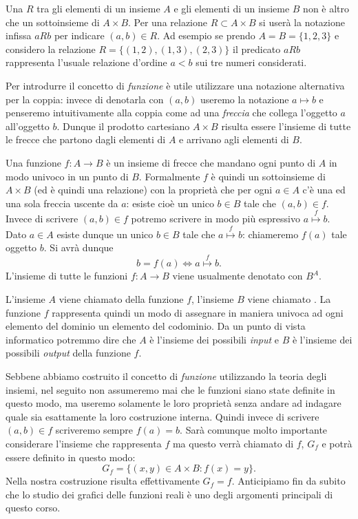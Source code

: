Una  $R$ tra gli elementi di un insieme $A$ e gli elementi
di un insieme $B$ non è altro che un sottoinsieme di $A\times B$.
Per una relazione $R\subset A\times B$ si userà la notazione infissa
$aRb$ per indicare $(a,b)\in R$.
Ad esempio se prendo $A=B=\{1,2,3\}$ e considero la relazione $R=\{(1,2),(1,3),(2,3)\}$
il predicato $aRb$ rappresenta l'usuale relazione d'ordine $a<b$ sui
tre numeri considerati.

Per introdurre il concetto di \emph{funzione} è utile
utilizzare una notazione alternativa per la coppia: invece di denotarla
con $(a,b)$ useremo la notazione $a \mapsto b$ e penseremo intuitivamente
alla coppia come ad una \emph{freccia} che collega l'oggetto $a$
all'oggetto $b$. Dunque il prodotto cartesiano
$A\times B$ risulta essere l'insieme di tutte le frecce che partono dagli
elementi di $A$ e arrivano agli elementi di $B$.

Una funzione $f\colon A \to B$ è un insieme di frecce che mandano
ogni punto di $A$ in modo univoco in un punto di $B$. Formalmente
$f$ è quindi un sottoinsieme di $A\times B$
(ed è quindi una relazione) con la proprietà che
per ogni $a\in A$ c'è una ed una sola freccia uscente da $a$:
esiste cioè un unico $b\in B$ tale che $(a,b)\in f$.
Invece di scrivere $(a,b)\in f$ potremo scrivere in modo più espressivo
$a\stackrel f \mapsto b$.
Dato $a\in A$ esiste dunque un unico $b\in B$ tale che
$a\stackrel f \mapsto b$: chiameremo $f(a)$ tale oggetto $b$.
Si avrà dunque
\[
 b=f(a) \iff a\stackrel f \mapsto b.
\]
L'insieme di tutte le funzioni $f\colon A\to B$ viene usualmente denotato con $B^A$.

L'insieme $A$ viene chiamato  della funzione $f$,
l'insieme $B$ viene chiamato .
La funzione $f$ rappresenta quindi un modo di assegnare in maniera univoca
ad ogni elemento del dominio un elemento del codominio.
Da un punto di vista informatico potremmo dire che $A$ è l'insieme
dei possibili \emph{input} e $B$ è l'insieme dei possibili \emph{output}
della funzione $f$.

Sebbene abbiamo costruito il concetto di \emph{funzione} utilizzando la teoria
degli insiemi, nel seguito non assumeremo mai che le funzioni siano state definite
in questo modo, ma useremo solamente le loro proprietà senza andare ad indagare
quale sia esattamente la loro costruzione interna.
Quindi invece di scrivere $(a,b)\in f$ scriveremo sempre $f(a)=b$.
Sarà comunque molto importante
considerare l'insieme che rappresenta $f$ ma questo verrà chiamato
 di $f$, $G_f$ e potrà essere definito in questo modo:
\[
  G_f = \{(x,y)\in A \times B\colon f(x)=y\}.
\]
Nella nostra costruzione risulta effettivamente $G_f = f$.
Anticipiamo fin da subito che lo studio dei grafici delle funzioni reali è
uno degli argomenti principali di questo corso.

